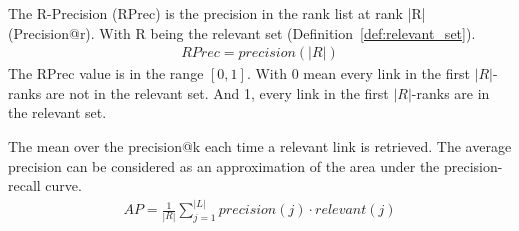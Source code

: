 \begin{definition}
  The R-Precision (RPrec) is the precision in the rank list at rank |R| (Precision@r).
  With R being the relevant set (Definition~\ref{def:relevant_set}).
  \begin{gather*}
    RPrec = precision(|R|)
  \end{gather*}
  The RPrec value is in the range $\left[0, 1\right]$.
  With 0 mean every link in the first $|R|$-ranks are not in the relevant set.
  And 1, every link in the first $|R|$-ranks are in the relevant set.
\end{definition}

\begin{definition}
  The mean over the precision@k each time a relevant link is retrieved.
  The average precision can be considered as an approximation of the area under the precision-recall curve.
  \begin{gather*}
    AP = \frac{1}{|R|} \sum_{j=1}^{|L|} precision(j) \cdot relevant(j)
  \end{gather*}
\end{definition}

